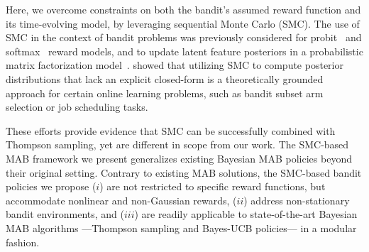 Here, we overcome constraints on both the bandit's assumed reward function and its time-evolving model,
by leveraging sequential Monte Carlo (SMC).
The use of SMC in the context of bandit problems was previously considered for probit~\citep{j-Cherkassky2013} and softmax~\citep{Urteaga2018} reward models,
and to update latent feature posteriors in a probabilistic matrix factorization model~\citep{ic-Kawale2015}.
%
\citet{ip-Gopalan2014} showed that utilizing SMC to compute posterior distributions that lack an explicit closed-form
is a theoretically grounded approach for certain online learning problems,
such as bandit subset arm selection or job scheduling tasks.

These efforts provide evidence that SMC can be successfully combined with Thompson sampling,
yet are different in scope from our work.
The SMC-based MAB framework we present generalizes existing Bayesian MAB policies beyond their original setting.
%
Contrary to existing MAB solutions, the SMC-based bandit policies we propose
($i$) are not restricted to specific reward functions,
but accommodate nonlinear and non-Gaussian rewards,
($ii$) address non-stationary bandit environments, and
($iii$) are readily applicable to state-of-the-art Bayesian MAB algorithms
---Thompson sampling and Bayes-UCB policies--- in a modular fashion.